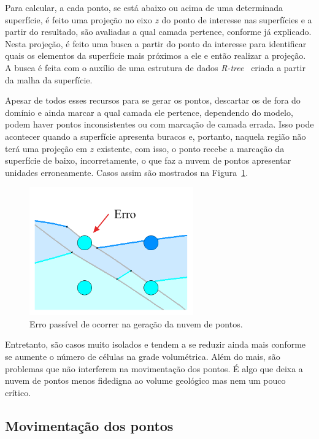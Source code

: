 Para calcular, a cada ponto, se está abaixo ou acima de uma determinada superfície, é feito uma projeção no eixo $z$ do ponto de interesse nas superfícies e a partir do resultado, são avaliadas a qual camada pertence, conforme já explicado. Nesta projeção, é feito uma busca a partir do ponto da interesse para identificar quais os elementos da superfície mais próximos a ele e então realizar a projeção. A busca é feita com o auxílio de uma estrutura de dados \emph{R-tree}~\cite{RTree} criada a partir da malha da superfície.

Apesar de todos esses recursos para se gerar os pontos, descartar os de fora do domínio e ainda marcar a qual camada ele pertence, dependendo do modelo, podem haver pontos inconsistentes ou com marcação de camada errada. Isso pode acontecer quando a superfície apresenta buracos e, portanto, naquela região não terá uma projeção em $z$ existente, com isso, o ponto recebe a marcação da superfície de baixo, incorretamente, o que faz a nuvem de pontos apresentar unidades erroneamente. Casos assim são mostrados na Figura~\ref{fig-vol-errors}.

\begin{figure} [H]
  \begin{center}
    \includegraphics[width=200pt]{images/fig-vol-errors}
    \caption{Erro passível de ocorrer na geração da nuvem de pontos.}\label{fig-vol-errors}
  \end{center}
\end{figure}

Entretanto, são casos muito isolados e tendem a se reduzir ainda mais conforme se aumente o número de células na grade volumétrica. Além do mais, são problemas que não interferem na movimentação dos pontos. É algo que deixa a nuvem de pontos menos fidedigna ao volume geológico mas nem um pouco crítico.

\subsection{Movimentação dos pontos}

